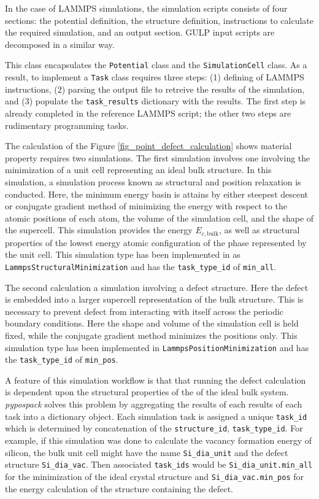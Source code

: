 In the case of LAMMPS simulations, the simulation scripts consists of four sections:  the potential definition, the structure definition, instructions to calculate the required simulation, and an output section.  GULP input scripts are decomposed in a similar way.

 This class encapsulates the \verb|Potential| class and the \verb|SimulationCell| class.  As a result, to implement a \verb|Task| class requires three steps: (1) defining of LAMMPS instructions, (2) parsing the output file to retreive the results of the simulation, and (3) populate the \verb|task_results| dictionary with the results.  The first step is already completed in the reference LAMMPS script; the other two steps are rudimentary programming tasks.

The calculation of the Figure \ref{fig_point_defect_calculation} shows material property requires two simulations.  The first simulation involves one involving the minimization of a unit cell representing an ideal bulk structure.  In this simulation, a simulation process known as structural and position relaxation is conducted.  Here, the minimum energy basin is attains by either steepest descent or conjugate gradient method of minimizing the energy with respect to the atomic positions of each atom, the volume of the simulation cell, and the shape of the supercell.  This simulation provides the energy $E_{c,\mathrm{bulk}}$, as well as structural properties of the lowest energy atomic configuration of the phase represented by the unit cell.  This simulation type has been implemented in as \verb|LammpsStructuralMinimization| and has the \verb|task_type_id| of \verb|min_all|.

The second calculation a simulation involving a defect structure.  Here the defect is embedded into a larger supercell representation of the bulk structure.  This is necessary to prevent defect from interacting with itself across the periodic boundary conditions.  Here the shape and volume of the simulation cell is held fixed, while the conjugate gradient method minimizes the positions only.  This simulation type has been implemented in \verb|LammpsPositionMinimization| and has the \verb|task_type_id| of \verb|min_pos|.

A feature of this simulation workflow is that that running the defect calculation is dependent upon the structural properties of the of the ideal bulk system.  \emph{pypospack} solves this problem by aggregating the results of each results of each task into a dictionary object.  Each simulation task is assigned a unique \verb|task_id| which is determined by concatenation of the \verb|structure_id|, \verb|task_type_id|.  For example, if this simulation was done to calculate the vacancy formation energy of silicon, the bulk unit cell might have the name \verb|Si_dia_unit| and the defect structure \verb|Si_dia_vac|.  Then associated \verb|task_ids| would be \verb|Si_dia_unit.min_all| for the minimization of the ideal crystal structure and \verb|Si_dia_vac.min_pos| for the energy calculation of the structure containing the defect.

